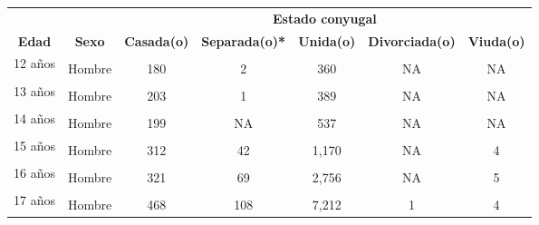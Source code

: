 \begin{tabular}[t]{ccccccc}
\toprule
\multicolumn{1}{c}{\textbf{ }} & \multicolumn{1}{c}{\textbf{ }} & \multicolumn{5}{c}{\textbf{Estado conyugal}} \\
\cmidrule(l{3pt}r{3pt}){3-7}
\textbf{Edad} & \textbf{Sexo} & \textbf{Casada(o)} & \textbf{Separada(o)*} & \textbf{Unida(o)} & \textbf{Divorciada(o)} & \textbf{Viuda(o)}\\
\midrule
\multirow{2}{1 cm}{12 años} & \cellcolor[HTML]{B6B3FF}{Mujer} & \cellcolor[HTML]{B6B3FF}{114} & \cellcolor[HTML]{B6B3FF}{4} & \cellcolor[HTML]{B6B3FF}{385} & \cellcolor[HTML]{B6B3FF}{NA} & \cellcolor[HTML]{B6B3FF}{NA}\\
 & Hombre & 180 & 2 & 360 & NA & NA\\
\multirow{2}{1 cm}{13 años} & \cellcolor[HTML]{B6B3FF}{Mujer} & \cellcolor[HTML]{B6B3FF}{99} & \cellcolor[HTML]{B6B3FF}{13} & \cellcolor[HTML]{B6B3FF}{640} & \cellcolor[HTML]{B6B3FF}{NA} & \cellcolor[HTML]{B6B3FF}{NA}\\
 & Hombre & 203 & 1 & 389 & NA & NA\\
\multirow{2}{1 cm}{14 años} & \cellcolor[HTML]{B6B3FF}{Mujer} & \cellcolor[HTML]{B6B3FF}{177} & \cellcolor[HTML]{B6B3FF}{51} & \cellcolor[HTML]{B6B3FF}{2,260} & \cellcolor[HTML]{B6B3FF}{NA} & \cellcolor[HTML]{B6B3FF}{NA}\\
 & Hombre & 199 & NA & 537 & NA & NA\\
\multirow{2}{1 cm}{15 años} & \cellcolor[HTML]{B6B3FF}{Mujer} & \cellcolor[HTML]{B6B3FF}{367} & \cellcolor[HTML]{B6B3FF}{287} & \cellcolor[HTML]{B6B3FF}{6,878} & \cellcolor[HTML]{B6B3FF}{2} & \cellcolor[HTML]{B6B3FF}{5}\\
 & Hombre & 312 & 42 & 1,170 & NA & 4\\
\multirow{2}{1 cm}{16 años} & \cellcolor[HTML]{B6B3FF}{Mujer} & \cellcolor[HTML]{B6B3FF}{685} & \cellcolor[HTML]{B6B3FF}{522} & \cellcolor[HTML]{B6B3FF}{14,356} & \cellcolor[HTML]{B6B3FF}{NA} & \cellcolor[HTML]{B6B3FF}{6}\\
 & Hombre & 321 & 69 & 2,756 & NA & 5\\
\multirow{2}{1 cm}{17 años} & \cellcolor[HTML]{B6B3FF}{Mujer} & \cellcolor[HTML]{B6B3FF}{1,881} & \cellcolor[HTML]{B6B3FF}{1,106} & \cellcolor[HTML]{B6B3FF}{27,467} & \cellcolor[HTML]{B6B3FF}{1} & \cellcolor[HTML]{B6B3FF}{16}\\
 & Hombre & 468 & 108 & 7,212 & 1 & 4\\
\bottomrule
\end{tabular}
